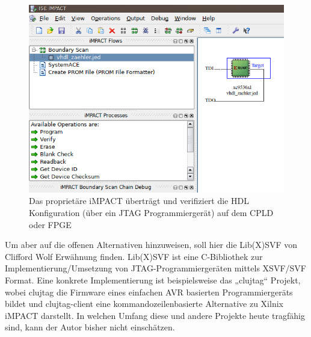\documentclass{article}
\begin{document}
\begin{figure}[!h]
	\centering
	\includegraphics[width=0.8\linewidth]{Figures/iMPACT}
	\caption{Das proprietäre iMPACT überträgt und verifiziert die HDL Konfiguration (über ein JTAG Programmiergerät) auf dem CPLD oder FPGE}
	\label{fig:iMPACT}
\end{figure}

Um aber auf die offenen Alternativen hinzuweisen, soll hier die Lib(X)SVF von Clifford Wolf\autocite{LibXSVF} Erwähnung finden. Lib(X)SVF ist eine C-Bibliothek zur Implementierung/Umsetzung von JTAG-Programmiergeräten mittels XSVF/SVF Format. Eine konkrete Implementierung ist beispielsweise das „clujtag“ Projekt, wobei clujtag \autocite{clujtag} die Firmware eines einfachen AVR basierten Programmiergeräts bildet und clujtag-client \autocite{clujtag-client} eine kommandozeilenbasierte Alternative zu Xilnix iMPACT darstellt.
In welchen Umfang diese und andere Projekte heute tragfähig sind, kann der Autor bisher nicht einschätzen.


\newpage
\printbibliography
\end{document}
